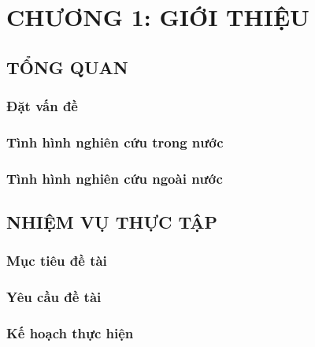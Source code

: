 \section*{CHƯƠNG 1: GIỚI THIỆU}
\setcounter{section}{1}
\subsection{TỔNG QUAN}
\subsubsection{Đặt vấn đề}
\subsubsection{Tình hình nghiên cứu trong nước}
\subsubsection{Tình hình nghiên cứu ngoài nước}

\subsection{NHIỆM VỤ THỰC TẬP}
\subsubsection{Mục tiêu đề tài}
\subsubsection{Yêu cầu đề tài}
\subsubsection{Kế hoạch thực hiện}
